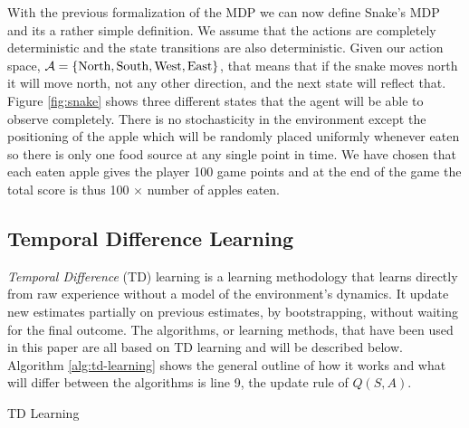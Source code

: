 \documentclass[result.tex]{subfiles}
\begin{document}
    With the previous formalization of the MDP we can now define Snake's MDP and its a rather simple definition. We assume that the actions are completely deterministic and the state transitions are also deterministic. Given our action space, $\mathcal{A} = \{ \text{North}, \text{South}, \text{West}, \text{East} \}$, that means that if the snake moves north it will move north, not any other direction, and the next state will reflect that. Figure \ref{fig:snake} shows three different states that the agent will be able to observe completely. There is no stochasticity in the environment except the positioning of the apple which will be randomly placed uniformly whenever eaten so there is only one food source at any single point in time. We have chosen that each eaten apple gives the player 100 game points and at the end of the game the total score is thus 100 $\times$ number of apples eaten.

    \subsection*{Temporal Difference Learning}

    \textit{Temporal Difference} (TD) learning is a learning methodology that learns directly from raw experience without a model of the environment's dynamics. It update new estimates partially on previous estimates, by bootstrapping, without waiting for the final outcome. The algorithms, or learning methods, that have been used in this paper are all based on TD learning and will be described below. Algorithm \ref{alg:td-learning} shows the general outline of how it works and what will differ between the algorithms is line 9, the update rule of $Q(S, A)$.

    \begin{algorithm}[H]
        \caption{TD Learning}
        \label{alg:td-learning}
        \begin{algorithmic}[1]
            \Statex


            \EndWhile
            \EndFor
            \State
            \EndFunction
        \end{algorithmic}
    \end{algorithm}
\end{document}
